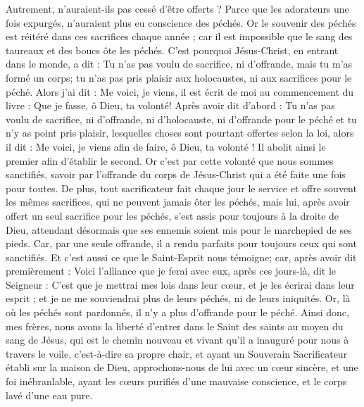 \begin{multicols}{2}
Autrement, n'auraient-ils pas cessé d'être offerts ? Parce que les adorateurs une fois expurgés, n'auraient plus eu conscience des péchés.
Or le souvenir des péchés est réitéré dans ces sacrifices chaque année ;
car il est impossible que le sang des taureaux et des boucs ôte les péchés.
C'est pourquoi Jésus-Christ, en entrant dans le monde, a dit : Tu n'as pas voulu de sacrifice, ni d'offrande, mais tu m'as formé un corps;
tu n'as pas pris plaisir aux holocaustes, ni aux sacrifices pour le péché.
Alors j'ai dit : Me voici, je viens, il est écrit de moi au commencement du livre : Que je fasse, ô Dieu, ta volonté!
Après avoir dit d'abord : Tu n'as pas voulu de sacrifice, ni d'offrande, ni d'holocauste, ni d'offrande pour le péché et tu n'y as point pris plaisir, lesquelles choses sont pourtant offertes selon la loi, alors il dit : Me voici, je viens afin de faire, ô Dieu, ta volonté !
Il abolit ainsi le premier afin d'établir le second.
Or c'est par cette volonté que nous sommes sanctifiés, savoir par l'offrande du corps de Jésus-Christ qui a été faite une fois pour toutes.
De plus, tout sacrificateur fait chaque jour le service et offre souvent les mêmes sacrifices, qui ne peuvent jamais ôter les péchés,
mais lui, après avoir offert un seul sacrifice pour les péchés, s'est assis pour toujours à la droite de Dieu,
attendant désormais que ses ennemis soient mis pour le marchepied de ses pieds.
Car, par une seule offrande, il a rendu parfaits pour toujours ceux qui sont sanctifiés.
Et c'est aussi ce que le Saint-Esprit nous témoigne; car, après avoir dit premièrement :
Voici l'alliance que je ferai avec eux, après ces jours-là, dit le Seigneur : C'est que je mettrai mes lois dans leur cœur, et je les écrirai dans leur esprit ;
et je ne me souviendrai plus de leurs péchés, ni de leurs iniquités.
Or, là où les péchés sont pardonnés, il n'y a plus d'offrande pour le péché.
Ainsi donc, mes frères, nous avons la liberté d'entrer dans le Saint des saints au moyen du sang de Jésus,
qui est le chemin nouveau et vivant qu'il a inauguré pour nous à travers le voile, c'est-à-dire sa propre chair,
et ayant un Souverain Sacrificateur établi sur la maison de Dieu,
approchons-nous de lui avec un cœur sincère, et une foi inébranlable, ayant les cœurs purifiés d'une mauvaise conscience, et le corps lavé d'une eau pure.

\end{multicols}
